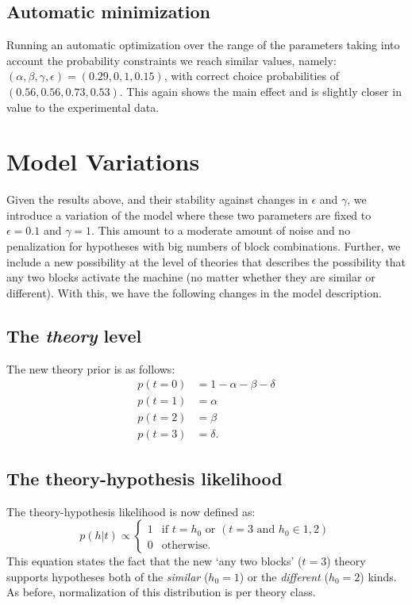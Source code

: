 \documentclass[11pt, a4paper]{article}
\begin{document}
 
 
\subsection*{Automatic minimization}
Running an automatic optimization over the range of the parameters taking into account the probability constraints we reach similar values, namely: $(\alpha,\beta,\gamma,\epsilon)=(0.29,0,1,0.15)$, with correct choice probabilities of $(0.56, 0.56, 0.73, 0.53)$. This again shows the main effect and is slightly closer in value to the experimental data. 
 
 
\section*{Model Variations}
Given the results above, and their stability against changes in $\epsilon$ and $\gamma$, we introduce a variation of the model where these two parameters are fixed to $\epsilon=0.1$ and $\gamma=1$. This amount to a moderate amount of noise and no penalization for hypotheses with big numbers of block combinations. Further, we include a new possibility at the level of theories that describes the possibility that any two blocks activate the machine (no matter whether they are similar or different). With this, we have the following changes in the model description.
 
\subsection*{The \emph{theory} level}
The new theory prior is as follows:
\begin{equation}
\begin{split}
p(t=0)&=1-\alpha-\beta-\delta\\
p(t=1)&=\alpha\\
p(t=2)&=\beta\\
p(t=3)&=\delta.
\end{split} 
\end{equation}
 
\subsection*{The theory-hypothesis likelihood}
The theory-hypothesis likelihood is now defined as:
\begin{equation}
p(h|t) \propto
\begin{cases}
1 & \mbox{if } t=h_0 \textrm{ or } (t=3 \textrm{ and } h_0\in{1,2}) \\ 
0 & \mbox{otherwise}.
\end{cases}
\end{equation}
This equation states the fact that the new `any two blocks' ($t=3$) theory supports hypotheses both of the \emph{similar} ($h_0=1$) or the \emph{different} ($h_0=2$) kinds. As before, normalization of this distribution is per theory class.
 
\end{document}
